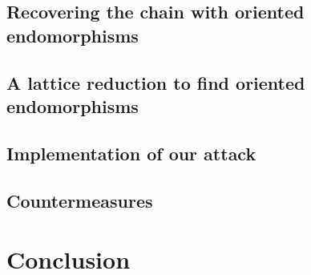 \documentclass[10pt]{beamer}
\theoremstyle{plain}
\theoremstyle{definition}
\renewcommand{\(}{\left(}
\renewcommand{\)}{\right)}
\begin{document}
\subsection{Recovering the chain with oriented endomorphisms}

\subsection{A lattice reduction to find oriented endomorphisms}

\subsection{Implementation of our attack}

\subsection{Countermeasures}

\section{Conclusion}
\end{document}
